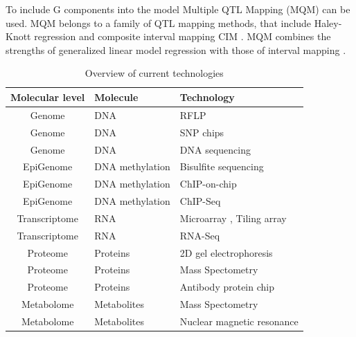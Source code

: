 To include G components into the model Multiple QTL Mapping (MQM) can be used. MQM belongs 
to a family of QTL mapping methods, that include Haley-Knott regression \cite{Haley:1992} 
and composite interval mapping CIM \cite{Zeng:1994}. MQM combines the strengths of 
generalized linear model regression with those of interval mapping \cite{Jansen:1993, Jansen:1994b}. 

\begin{table}[h]
  \centering
  {\footnotesize
  \begin{tabular}{ | c | l | l | }
    \hline
    {\bf Molecular level} & {\bf Molecule} & {\bf Technology}\\
    \hline
    \hline
\rowcolor{gray!35}    Genome          & DNA                & RFLP \cite{Lander:1986} \\
\rowcolor{gray!35}    Genome          & DNA                & SNP chips \cite{Hacia:1999} \\
\rowcolor{gray!35}    Genome          & DNA                & DNA sequencing \cite{Mardis:2008} \\
    \hline
    EpiGenome       & DNA methylation    & Bisulfite sequencing \cite{Hayatsu:2007} \\
    EpiGenome       & DNA methylation    & ChIP-on-chip \cite{Collas:2010} \\
    EpiGenome       & DNA methylation    & ChIP-Seq \cite{Park:2009} \\
    \hline
    \hline
\rowcolor{gray!35}    Transcriptome   & RNA          & Microarray \cite{Lashkari:1997}, Tiling array \cite{Lee:2013} \\
\rowcolor{gray!35}    Transcriptome   & RNA          & RNA-Seq \cite{Wang:2009}\\
    \hline
    Proteome        & Proteins     & 2D gel electrophoresis \cite{O'Farrell:1975}\\
    Proteome        & Proteins     & Mass Spectometry \cite{Deshaies:2001}\\
    Proteome        & Proteins     & Antibody protein chip \cite{Fasolo:2009} \\
    \hline
\rowcolor{gray!35}    Metabolome      & Metabolites  & Mass Spectometry \cite{Aebersold:2003} \\
\rowcolor{gray!35}    Metabolome      & Metabolites  & Nuclear magnetic resonance \cite{Espina:2009} \\
    \hline
  \end{tabular}
  }
  \caption[Overview]{Overview of current technologies}
\end{table}


